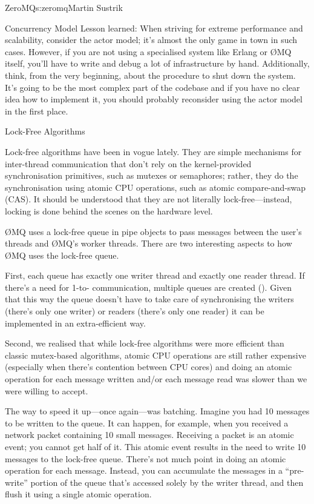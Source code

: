 \begin{aosachapter}{ZeroMQ}{s:zeromq}{Martin Sustrik}
\begin{aosasect1}{Concurrency Model}
Lesson learned: When striving for extreme performance and scalability,
consider the actor model; it's almost the only game in town in such
cases. However, if you are not using a specialised system like Erlang or
{\O}MQ itself, you'll have to write and debug a lot of infrastructure by
hand. Additionally, think, from the very beginning, about the procedure 
to shut down the system. It's going to be the most complex part of the codebase and
if you have no clear idea how to implement it, you should probably
reconsider using the actor model in the first place.

\end{aosasect1}

\begin{aosasect1}{Lock-Free Algorithms}

Lock-free algorithms have been in vogue lately. They are simple
mechanisms for inter-thread communication that don't rely on the
kernel-provided synchronisation primitives, such as mutexes or
semaphores; rather, they do the synchronisation using atomic CPU
operations, such as atomic compare-and-swap (CAS). It should be
understood that they are not literally lock-free---instead, locking is
done behind the scenes on the hardware level.

{\O}MQ uses a lock-free queue in pipe objects to pass messages between the
user's threads and {\O}MQ's worker threads. There are two interesting
aspects to how {\O}MQ uses the lock-free queue.

First, each queue has exactly one writer thread and exactly one reader
thread. If there's a need for 1-to- communication, multiple queues
are created ().  Given that this way
the queue doesn't have to take care of synchronising the writers
(there's only one writer) or readers (there's only one reader) it can
be implemented in an extra-efficient way.


Second, we realised that while lock-free algorithms were more
efficient than classic mutex-based algorithms, atomic CPU operations
are still rather expensive (especially when there's contention between
CPU cores) and doing an atomic operation for each message written
and/or each message read was slower than we were willing to accept.

The way to speed it up---once again---was batching.  Imagine you had
10 messages to be written to the queue. It can happen, for example,
when you received a network packet containing 10 small
messages. Receiving a packet is an atomic event; you cannot get 
half of it. This atomic event results in the need to write 10 messages to
the lock-free queue. There's not much point in doing an atomic
operation for each message. Instead, you can accumulate the messages
in a ``pre-write'' portion of the queue that's accessed solely by the
writer thread, and then flush it using a single atomic operation.


\end{aosasect1}
\end{aosachapter}
